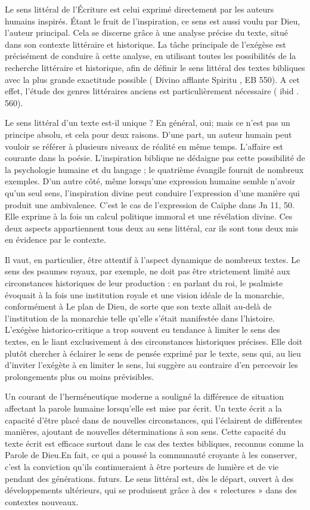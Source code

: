 Le sens littéral de l'Écriture est celui exprimé directement par les auteurs humains inspirés. Étant le fruit de l'inspiration, ce sens est aussi voulu par Dieu, l'auteur principal. Cela se discerne grâce à une analyse précise du texte, situé dans son contexte littéraire et historique. La tâche principale de l'exégèse est précisément de conduire à cette analyse, en utilisant toutes les possibilités de la recherche littéraire et historique, afin de définir le sens littéral des textes bibliques avec la plus grande exactitude possible ( Divino afflante Spiritu , EB 550). A cet effet, l'étude des genres littéraires anciens est particulièrement nécessaire ( ibid . 560).   

Le sens littéral d'un texte est-il unique ? En général, oui; mais ce n'est pas un principe absolu, et cela pour deux raisons. D'une part, un auteur humain peut vouloir se référer à plusieurs niveaux de réalité en même temps. L'affaire est courante dans la poésie. L'inspiration biblique ne dédaigne pas cette possibilité de la psychologie humaine et du langage ; le quatrième évangile fournit de nombreux exemples. D'un autre côté, même lorsqu'une expression humaine semble n'avoir qu'un seul sens, l'inspiration divine peut conduire l'expression d'une manière qui produit une ambivalence. C'est le cas de l'expression de Caïphe dans Jn 11, 50. Elle exprime à la fois un calcul politique immoral et une révélation divine. Ces deux aspects appartiennent tous deux au sens littéral, car ils sont tous deux mis en évidence par le contexte.   

Il vaut, en particulier, être attentif à l'aspect dynamique de nombreux textes. Le sens des psaumes royaux, par exemple, ne doit pas être strictement limité aux circonstances historiques de leur production : en parlant du roi, le psalmiste évoquait à la fois une institution royale et une vision idéale de la monarchie, conformément à Le plan de Dieu, de sorte que son texte allait au-delà de l'institution de la monarchie telle qu'elle s'était manifestée dans l'histoire. L'exégèse historico-critique a trop souvent eu tendance à limiter le sens des textes, en le liant exclusivement à des circonstances historiques précises. Elle doit plutôt chercher à éclairer le sens de pensée exprimé par le texte, sens qui, au lieu d'inviter l'exégète à en limiter le sens, lui suggère au contraire d'en percevoir les prolongements plus ou moins prévisibles.

Un courant de l'herméneutique moderne a souligné la différence de situation affectant la parole humaine lorsqu'elle est mise par écrit. Un texte écrit a la capacité d'être placé dans de nouvelles circonstances, qui l'éclairent de différentes manières, ajoutant de nouvelles déterminations à son sens. Cette capacité du texte écrit est efficace surtout dans le cas des textes bibliques, reconnus comme la Parole de Dieu.En fait, ce qui a poussé la communauté croyante à les conserver, c'est la conviction qu'ils continueraient à être porteurs de lumière et de vie pendant des générations. futurs. Le sens littéral est, dès le départ, ouvert à des développements ultérieurs, qui se produisent grâce à des « relectures » dans des contextes nouveaux.

